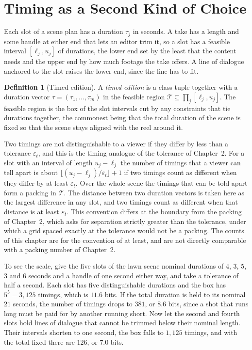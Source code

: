 \documentclass[11pt,twoside,openright]{book}
\theoremstyle{plain}
\theoremstyle{definition}
\newtheorem{definition}[theorem]{Definition}
\theoremstyle{remark}
\begin{document}
\section{Timing as a Second Kind of Choice}\label{sec:timing}

Each slot of a scene plan has a duration $\tau_j$ in seconds. A take has a length and some handle at either end that lets an editor trim it, so a slot has a feasible interval $[\ell_j,u_j]$ of durations, the lower end set by the least that the content needs and the upper end by how much footage the take offers. A line of dialogue anchored to the slot raises the lower end, since the line has to fit.

\begin{definition}[Timed edition]\label{def:timed}
A \emph{timed edition} is a class tuple together with a duration vector $\tau=(\tau_1,\dots,\tau_m)$ in the feasible region $\mathcal T\subseteq\prod_j[\ell_j,u_j]$. The feasible region is the box of the slot intervals cut by any constraints that tie durations together, the commonest being that the total duration of the scene is fixed so that the scene stays aligned with the reel around it.
\end{definition}

Two timings are not distinguishable to a viewer if they differ by less than a tolerance $\varepsilon_t$, and this is the timing analogue of the tolerance of Chapter~2. For a slot with an interval of length $u_j-\ell_j$ the number of timings that a viewer can tell apart is about $\lfloor(u_j-\ell_j)/\varepsilon_t\rfloor+1$ if two timings count as different when they differ by at least $\varepsilon_t$. Over the whole scene the timings that can be told apart form a packing in $\mathcal T$. The distance between two duration vectors is taken here as the largest difference in any slot, and two timings count as different when that distance is at least $\varepsilon_t$. This convention differs at the boundary from the packing of Chapter~2, which asks for separation strictly greater than the tolerance, under which a grid spaced exactly at the tolerance would not be a packing. The counts of this chapter are for the convention of at least, and are not directly comparable with a packing number of Chapter~2.

To see the scale, give the five slots of the lawn scene nominal durations of $4$, $3$, $5$, $3$ and $6$ seconds and a handle of one second either way, and take a tolerance of half a second. Each slot has five distinguishable durations and the box has $5^5=3{,}125$ timings, which is $11.6$ bits. If the total duration is held to its nominal $21$ seconds, the number of timings drops to $381$, or $8.6$ bits, since a shot that runs long must be paid for by another running short. Now let the second and fourth slots hold lines of dialogue that cannot be trimmed below their nominal length. Their intervals shorten to one second, the box falls to $1{,}125$ timings, and with the total fixed there are $126$, or $7.0$ bits.
\end{document}
